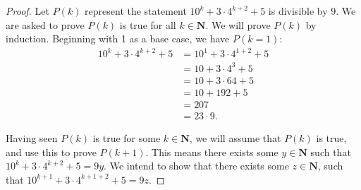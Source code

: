 \documentclass[12pt,oneside]{amsart}
\theoremstyle{remark}
\newcommand{\bfN}{\mathbf{N}}
\begin{document}
\begin{proof}
Let $P(k)$ represent the statement $10^k + 3 \cdot 4^{k + 2} + 5$ is divisible by $9$. We are asked to prove $P(k)$ is true for all $k \in \bfN$.  We will prove $P(k)$ by induction. Beginning with 1 as a base case, we have $P(k = 1)$:
\begin{align*}
10^k + 3 \cdot 4^{k+2} + 5 &= 10^1 + 3 \cdot 4^{1 + 2} + 5 \\
                           &= 10 + 3 \cdot 4^3 + 5 \\
                           &= 10 + 3 \cdot 64 + 5 \\
                           &= 10 + 192 + 5 \\
                           &= 207 \\
                           &= 23 \cdot 9.
\end{align*}

Having seen $P(k)$ is true for some $k \in \bfN$, we will assume that $P(k)$ is true, and use this to prove $P(k + 1)$. This means there exists some $y \in \bfN$ such that $10^k + 3 \cdot 4^{k + 2} + 5 = 9y$. We intend to show that there exists some $z \in \bfN$, such that $10^{k + 1} + 3 \cdot 4^{k + 1 + 2} + 5 = 9z$.


\end{proof}
\end{document}
